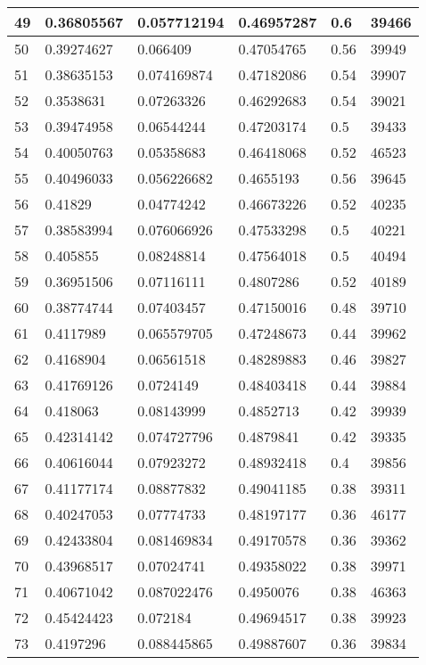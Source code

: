 \begin{longtable}{|l|l|l|l|l|l|}
49 & 0.36805567 & 0.057712194 & 0.46957287 & 0.6 & 39466 \\ \hline 
50 & 0.39274627 & 0.066409 & 0.47054765 & 0.56 & 39949 \\ \hline 
51 & 0.38635153 & 0.074169874 & 0.47182086 & 0.54 & 39907 \\ \hline 
52 & 0.3538631 & 0.07263326 & 0.46292683 & 0.54 & 39021 \\ \hline 
53 & 0.39474958 & 0.06544244 & 0.47203174 & 0.5 & 39433 \\ \hline 
54 & 0.40050763 & 0.05358683 & 0.46418068 & 0.52 & 46523 \\ \hline 
55 & 0.40496033 & 0.056226682 & 0.4655193 & 0.56 & 39645 \\ \hline 
56 & 0.41829 & 0.04774242 & 0.46673226 & 0.52 & 40235 \\ \hline 
57 & 0.38583994 & 0.076066926 & 0.47533298 & 0.5 & 40221 \\ \hline 
58 & 0.405855 & 0.08248814 & 0.47564018 & 0.5 & 40494 \\ \hline 
59 & 0.36951506 & 0.07116111 & 0.4807286 & 0.52 & 40189 \\ \hline 
60 & 0.38774744 & 0.07403457 & 0.47150016 & 0.48 & 39710 \\ \hline 
61 & 0.4117989 & 0.065579705 & 0.47248673 & 0.44 & 39962 \\ \hline 
62 & 0.4168904 & 0.06561518 & 0.48289883 & 0.46 & 39827 \\ \hline 
63 & 0.41769126 & 0.0724149 & 0.48403418 & 0.44 & 39884 \\ \hline 
64 & 0.418063 & 0.08143999 & 0.4852713 & 0.42 & 39939 \\ \hline 
65 & 0.42314142 & 0.074727796 & 0.4879841 & 0.42 & 39335 \\ \hline 
66 & 0.40616044 & 0.07923272 & 0.48932418 & 0.4 & 39856 \\ \hline 
67 & 0.41177174 & 0.08877832 & 0.49041185 & 0.38 & 39311 \\ \hline 
68 & 0.40247053 & 0.07774733 & 0.48197177 & 0.36 & 46177 \\ \hline 
69 & 0.42433804 & 0.081469834 & 0.49170578 & 0.36 & 39362 \\ \hline 
70 & 0.43968517 & 0.07024741 & 0.49358022 & 0.38 & 39971 \\ \hline 
71 & 0.40671042 & 0.087022476 & 0.4950076 & 0.38 & 46363 \\ \hline 
72 & 0.45424423 & 0.072184 & 0.49694517 & 0.38 & 39923 \\ \hline 
73 & 0.4197296 & 0.088445865 & 0.49887607 & 0.36 & 39834 \\ \hline 

\end{longtable}
